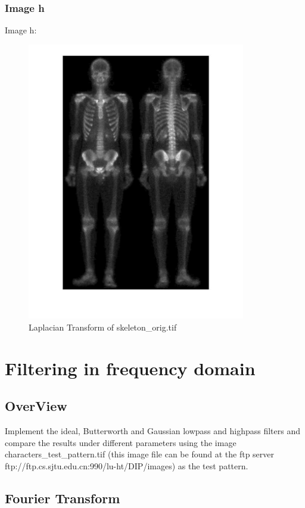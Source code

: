 \documentclass[11pt,oneside]{book}
\begin{document}
\subsection{Image h}
Image h:
\begin{figure}[!htb]
   \centering  
   \includegraphics[width=0.85\textwidth]{images/2/h.jpg}
   \caption{Laplacian Transform of skeleton\_orig.tif}  
\end{figure}
\chapter{Filtering in frequency domain}
\section{OverView}
Implement the ideal, Butterworth and Gaussian lowpass and highpass filters and compare the results under different parameters using the image characters\_test\_pattern.tif (this image file can be found at the ftp server ftp://ftp.cs.sjtu.edu.cn:990/lu-ht/DIP/images) as the test pattern.

\section{Fourier Transform}
\end{document}
